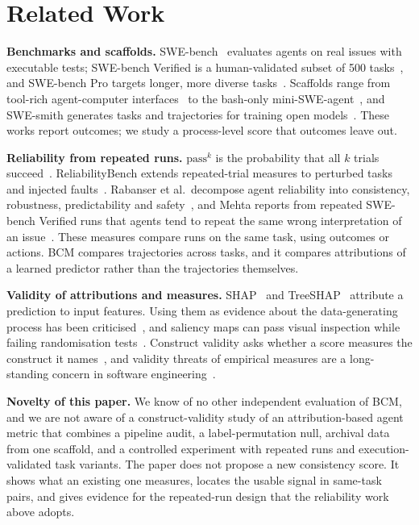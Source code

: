 \documentclass[conference]{IEEEtran}
\newcommand{\bcm}{\textsc{BCM}}
\begin{document}
\section{Related Work}
\label{sec:related}
\textbf{Benchmarks and scaffolds.} SWE-bench~\cite{jimenez2024swebench} evaluates agents on real issues with executable tests; SWE-bench Verified is a human-validated subset of 500 tasks~\cite{openai2024verified}, and SWE-bench Pro targets longer, more diverse tasks~\cite{deng2025swebenchpro}. Scaffolds range from tool-rich agent-computer interfaces~\cite{yang2024sweagent} to the bash-only mini-SWE-agent~\cite{minisweagent}, and SWE-smith generates tasks and trajectories for training open models~\cite{yang2025swesmith}. These works report outcomes; we study a process-level score that outcomes leave out.

\textbf{Reliability from repeated runs.} $\text{pass}^k$ is the probability that all $k$ trials succeed~\cite{yao2024taubench}. ReliabilityBench extends repeated-trial measures to perturbed tasks and injected faults~\cite{gupta2026reliabilitybench}. Rabanser et al.\ decompose agent reliability into consistency, robustness, predictability and safety~\cite{rabanser2026reliability}, and Mehta reports from repeated SWE-bench Verified runs that agents tend to repeat the same wrong interpretation of an issue~\cite{mehta2026confident}. These measures compare runs on the same task, using outcomes or actions. \bcm{} compares trajectories across tasks, and it compares attributions of a learned predictor rather than the trajectories themselves.

\textbf{Validity of attributions and measures.} SHAP~\cite{lundberg2017shap} and TreeSHAP~\cite{lundberg2020treeshap} attribute a prediction to input features. Using them as evidence about the data-generating process has been criticised~\cite{kumar2020shapproblems}, and saliency maps can pass visual inspection while failing randomisation tests~\cite{adebayo2018sanity}. Construct validity asks whether a score measures the construct it names~\cite{cronbach1955construct,messick1995validity}, and validity threats of empirical measures are a long-standing concern in software engineering~\cite{wohlin2012experimentation}.

\textbf{Novelty of this paper.} We know of no other independent evaluation of \bcm, and we are not aware of a construct-validity study of an attribution-based agent metric that combines a pipeline audit, a label-permutation null, archival data from one scaffold, and a controlled experiment with repeated runs and execution-validated task variants. The paper does not propose a new consistency score. It shows what an existing one measures, locates the usable signal in same-task pairs, and gives evidence for the repeated-run design that the reliability work above adopts.
\end{document}

